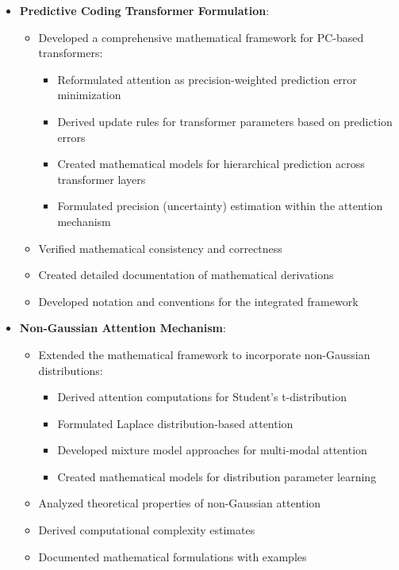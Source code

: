 \documentclass{article}
\begin{document}
\begin{itemize}
  \item \textbf{Predictive Coding Transformer Formulation}:
  \begin{itemize}
    \item Developed a comprehensive mathematical framework for PC-based transformers:
    \begin{itemize}
      \item Reformulated attention as precision-weighted prediction error minimization
      \item Derived update rules for transformer parameters based on prediction errors
      \item Created mathematical models for hierarchical prediction across transformer layers
      \item Formulated precision (uncertainty) estimation within the attention mechanism
    \end{itemize}
    \item Verified mathematical consistency and correctness
    \item Created detailed documentation of mathematical derivations
    \item Developed notation and conventions for the integrated framework
  \end{itemize}

  \item \textbf{Non-Gaussian Attention Mechanism}:
  \begin{itemize}
    \item Extended the mathematical framework to incorporate non-Gaussian distributions:
    \begin{itemize}
      \item Derived attention computations for Student's t-distribution
      \item Formulated Laplace distribution-based attention
      \item Developed mixture model approaches for multi-modal attention
      \item Created mathematical models for distribution parameter learning
    \end{itemize}
    \item Analyzed theoretical properties of non-Gaussian attention
    \item Derived computational complexity estimates
    \item Documented mathematical formulations with examples
  \end{itemize}


\end{itemize}
\end{document}
